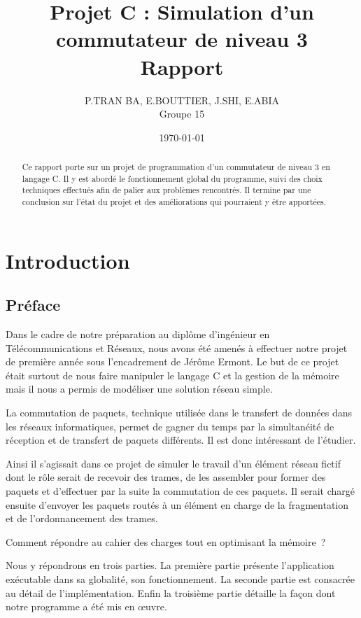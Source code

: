 \documentclass[a4paper,11pt]{article}
\title{Projet C : Simulation d'un commutateur de niveau 3\\Rapport}
\author{P.TRAN BA, E.BOUTTIER, J.SHI, E.ABIA\\Groupe 15}
\date\today
\begin{document}
\maketitle

\begin{abstract}

Ce rapport porte sur un projet de programmation d'un commutateur de niveau 3 en langage C. Il y est abordé le fonctionnement global du programme, suivi des choix techniques effectués afin de palier aux problèmes rencontrés. Il termine par une conclusion sur l'état du projet et des améliorations qui pourraient y être apportées.

\end{abstract}

\tableofcontents

\newpage

\section{Introduction}
\subsection{Préface}

Dans le cadre de notre préparation au diplôme d'ingénieur en Télécommunications et Réseaux, nous avons été amenés à effectuer notre projet de première année sous l’encadrement de Jérôme Ermont. Le but de ce projet était surtout de nous faire manipuler le langage C et la gestion de la mémoire mais il nous a permis de modéliser une solution réseau simple.

La commutation de paquets, technique utilisée dans le transfert de données dans les réseaux informatiques, permet de gagner du temps par la simultanéité de réception et de transfert de paquets différents. Il est donc intéressant de l’étudier. 

Ainsi il s’agissait dans ce projet de simuler le travail d’un élément réseau fictif dont le rôle serait de recevoir des trames, de les assembler pour former des paquets et d’effectuer par la suite la commutation de ces paquets. Il serait chargé ensuite d’envoyer les paquets routés à un élément en charge de la fragmentation et de l’ordonnancement des trames.

Comment répondre au cahier des charges tout en optimisant la mémoire ? 

Nous y répondrons en trois parties. La première partie présente l’application exécutable dans sa globalité, son fonctionnement. La seconde partie est consacrée au détail de l’implémentation. Enfin la troisième partie détaille la façon dont notre programme a été mis en œuvre.
\end{document}

